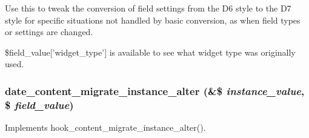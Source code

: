Use this to tweak the conversion of field settings from the D6 style to the D7 style for specific situations not handled by basic conversion, as when field types or settings are changed.

\$field\_\-value\mbox{[}'widget\_\-type'\mbox{]} is available to see what widget type was originally used. \hypertarget{date_8field_8inc_a9ac2d36de9d064358aa6aa0fbdc7ce55}{
\subsubsection[{date\_\-content\_\-migrate\_\-instance\_\-alter}]{\setlength{\rightskip}{0pt plus 5cm}date\_\-content\_\-migrate\_\-instance\_\-alter (\&\$ {\em instance\_\-value}, \/  \$ {\em field\_\-value})}}
\label{date_8field_8inc_a9ac2d36de9d064358aa6aa0fbdc7ce55}
Implements hook\_\-content\_\-migrate\_\-instance\_\-alter().

